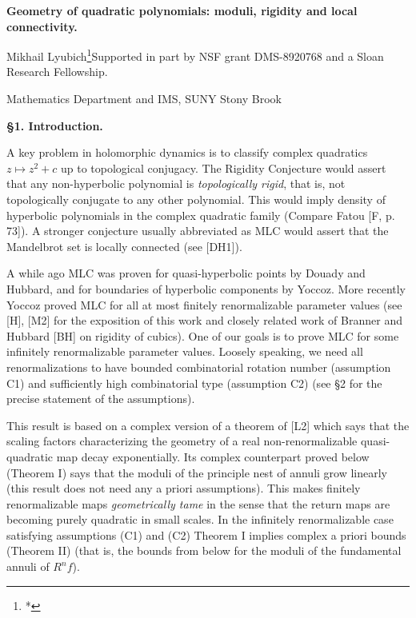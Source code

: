    

\def\**{$*\!*\!*$}

%


\centerline{\bf Geometry of quadratic polynomials:
 moduli, rigidity and local connectivity.}
\smallskip

\medskip

\centerline{Mikhail Lyubich\footnote{*}{\rm Supported in part by 
NSF grant DMS-8920768 and a Sloan Research Fellowship.}}\smallskip
\centerline{Mathematics Department and IMS, SUNY Stony Brook}\bigskip


\centerline {\bf \S1. Introduction.}\bigskip

A key problem in holomorphic dynamics is to classify
 complex quadratics
$z\mapsto z^2+c$
 up to topological conjugacy. The Rigidity Conjecture would assert that any
non-hyperbolic polynomial  is {\sl topologically rigid},
 that is, not topologically conjugate
to any other polynomial. This would imply density of hyperbolic 
polynomials in the complex quadratic family (Compare Fatou [F, p. 73]).
A stronger conjecture  
usually abbreviated as MLC would assert that the Mandelbrot set is locally
connected (see [DH1]).
  
A while ago MLC was proven for quasi-hyperbolic points by Douady and Hubbard,
and for boundaries of hyperbolic components by Yoccoz.
More recently Yoccoz proved MLC for all at most finitely renormalizable
parameter values (see [H], [M2] for the exposition of this work and 
closely related work of Branner and Hubbard  [BH] on rigidity of cubics). One of
our goals is to prove MLC for some infinitely renormalizable parameter values.
Loosely speaking, we need all renormalizations to have bounded combinatorial 
rotation number (assumption C1) and sufficiently high
  combinatorial type (assumption C2)
(see \S 2 for the  precise statement of the assumptions).

This result is based on a complex version of a theorem of [L2] which
says that the scaling factors characterizing the geometry
of a real non-renormalizable quasi-quadratic map  decay exponentially. 
Its complex counterpart proved below  (Theorem I) says that  the moduli of the 
principle nest of annuli  grow  linearly (this result does not need
any a priori assumptions). This makes finitely renormalizable  maps
{\sl geometrically tame}
in the sense that the return maps are becoming purely quadratic in small
scales.  In the infinitely renormalizable case satisfying
 assumptions (C1) and (C2) Theorem I implies
 complex a priori bounds  (Theorem II)
  (that is, the  bounds from below for the moduli of the fundamental 
annuli of $R^nf$). 

